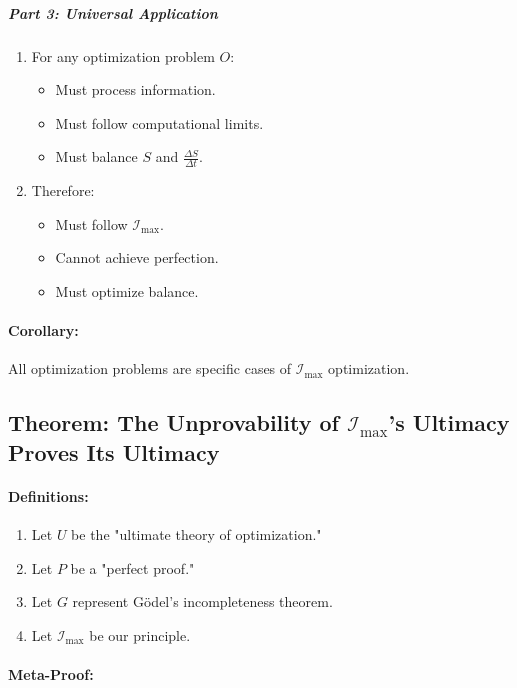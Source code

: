 \documentclass[12pt]{article}
\begin{document}
\subparagraph{Part 3: Universal Application}
\begin{enumerate}
    \item For any optimization problem \(O\):
    \begin{itemize}
        \item Must process information.
        \item Must follow computational limits.
        \item Must balance \(S\) and \(\frac{\Delta S}{\Delta t}\).
    \end{itemize}
    \item Therefore:
    \begin{itemize}
        \item Must follow \(\mathcal{I}_{\text{max}}\).
        \item Cannot achieve perfection.
        \item Must optimize balance.
    \end{itemize}
\end{enumerate}

\paragraph{Corollary:}
All optimization problems are specific cases of \(\mathcal{I}_{\text{max}}\) optimization.

\subsection{Theorem: The Unprovability of \(\mathcal{I}_{\text{max}}\)'s Ultimacy Proves Its Ultimacy}

\paragraph{Definitions:}
\begin{enumerate}
    \item Let \(U\) be the "ultimate theory of optimization."
    \item Let \(P\) be a "perfect proof."
    \item Let \(G\) represent Gödel's incompleteness theorem.
    \item Let \(\mathcal{I}_{\text{max}}\) be our principle.
\end{enumerate}

\paragraph{Meta-Proof:}
\end{document}
